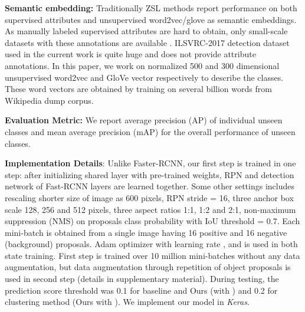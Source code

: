 \documentclass[runningheads]{llncs}
\begin{document}
\textbf{Semantic embedding:} Traditionally ZSL methods report performance on both supervised attributes and unsupervised word2vec/glove as semantic embeddings. As manually labeled supervised attributes are hard to obtain, only small-scale datasets with these annotations are available \cite{aPY_2009,AwA_2009}. ILSVRC-2017 detection dataset used in the current work is quite huge and does not provide attribute annotations. In this paper, we work on  normalized 500 and 300 dimensional unsupervised word2vec \cite{Mikolov_NIPS_2013} and GloVe \cite{Jeffrey_Glove_2014} vector respectively to describe the classes. These word vectors are obtained by training on several billion words from Wikipedia dump corpus. 



\textbf{Evaluation Metric:} We report average precision (AP) of individual unseen classes and mean average precision (mAP) for the overall performance of unseen classes. 


\textbf{Implementation Details}: Unlike Faster-RCNN, our first step is trained in one step: after initializing shared layer with pre-trained weights, RPN and detection network of Fast-RCNN layers are learned together. Some other settings includes rescaling shorter size of image as 600 pixels, RPN stride = 16, three anchor box scale 128, 256 and 512 pixels, three aspect ratios 1:1, 1:2 and 2:1, non-maximum suppression (NMS) on proposals class probability with IoU threshold = 0.7. Each mini-batch is obtained from a single image having 16 positive and 16 negative (background) proposals. Adam optimizer with learning rate ,  and  is used in both state training. First step is trained over 10 million mini-batches without any data augmentation, but data augmentation through repetition of object proposals is used in second step (details in supplementary material). During testing, the prediction score threshold was 0.1 for baseline and Ours (with ) and 0.2 for clustering method (Ours with ). We implement our model in \textit{Keras}.
\end{document}
